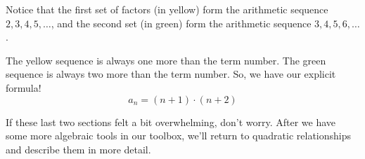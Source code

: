 \begin{boxedex}
Notice that the first set of factors (in yellow) form the arithmetic sequence $2, 3, 4, 5, \dotsc$, and the second set (in green) form the arithmetic sequence $3, 4, 5, 6, \dotsc$.

The yellow sequence is always one more than the term number. The green sequence is always two more than the term number. So, we have our explicit formula! \[a_n = (n+1)\cdot(n+2)\]
\end{boxedex}

If these last two sections felt a bit overwhelming, don't worry. After we have some more algebraic tools in our toolbox, we'll return to quadratic relationships and describe them in more detail.
